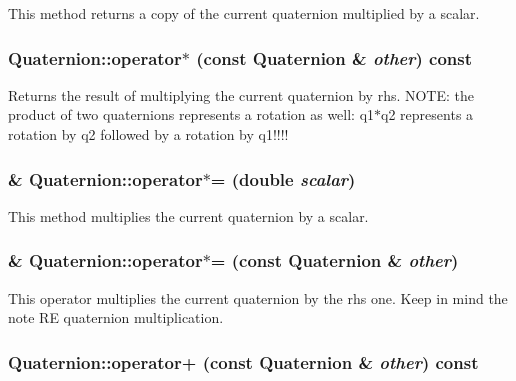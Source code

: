 \label{classCartWheel_1_1Math_1_1Quaternion_acc184b31d51f8c0289d3e2b8480f417c}
This method returns a copy of the current quaternion multiplied by a scalar. \hypertarget{classCartWheel_1_1Math_1_1Quaternion_a2c0b7e2bccac0e3b060d34a717766e82}{
\subsubsection[{operator$\ast$}]{ Quaternion::operator$\ast$ (const {\bf Quaternion} \& {\em other}) const}}
\label{classCartWheel_1_1Math_1_1Quaternion_a2c0b7e2bccac0e3b060d34a717766e82}
Returns the result of multiplying the current quaternion by rhs. NOTE: the product of two quaternions represents a rotation as well: q1$\ast$q2 represents a rotation by q2 followed by a rotation by q1!!!! \hypertarget{classCartWheel_1_1Math_1_1Quaternion_aeb9598aa34468c5b574edbe426ac804d}{
\subsubsection[{operator$\ast$=}]{ \& Quaternion::operator$\ast$= (double {\em scalar})}}
\label{classCartWheel_1_1Math_1_1Quaternion_aeb9598aa34468c5b574edbe426ac804d}
This method multiplies the current quaternion by a scalar. \hypertarget{classCartWheel_1_1Math_1_1Quaternion_a1ce8c3d9748274407b75769518a423a1}{
\subsubsection[{operator$\ast$=}]{ \& Quaternion::operator$\ast$= (const {\bf Quaternion} \& {\em other})}}
\label{classCartWheel_1_1Math_1_1Quaternion_a1ce8c3d9748274407b75769518a423a1}
This operator multiplies the current quaternion by the rhs one. Keep in mind the note RE quaternion multiplication. \hypertarget{classCartWheel_1_1Math_1_1Quaternion_a79270e624e3e99620857535b3c8565a1}{
\subsubsection[{operator+}]{ Quaternion::operator+ (const {\bf Quaternion} \& {\em other}) const}}
